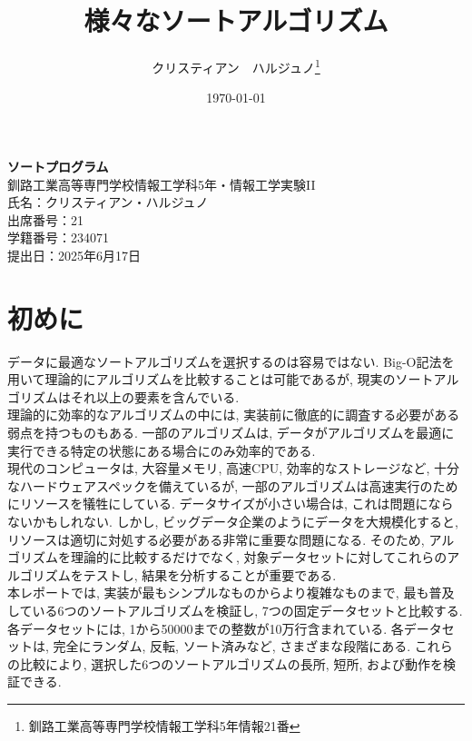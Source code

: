 \documentclass[a4j, 11pt]{jarticle}
\title{様々なソートアルゴリズム}
\author{クリスティアン　ハルジュノ\thanks{釧路工業高等専門学校情報工学科5年情報21番}}
\date{\today}
\begin{document}
\begin{titlepage}
  \centering
  \vspace*{3cm}

  {\fontsize{25pt}{36pt}\selectfont\bfseries ソートプログラム} \\[1cm]  %
  {\Large 釧路工業高等専門学校情報工学科5年・情報工学実験II} \\[1cm]
  {\large 氏名：クリスティアン・ハルジュノ} \\[1cm]
  {\large 出席番号：21} \\[1cm]
  {\large 学籍番号：234071} \\[5cm]


  {\Large 提出日：2025年6月17日} \\

  \vfill

\end{titlepage}
\tableofcontents
\newpage
\setcounter{page}{1}
\section{初めに}
データに最適なソートアルゴリズムを選択するのは容易ではない. Big-O記法を用いて理論的にアルゴリズムを比較することは可能であるが, 現実のソートアルゴリズムはそれ以上の要素を含んでいる\cite{energo2023bigoh}. \\

理論的に効率的なアルゴリズムの中には, 実装前に徹底的に調査する必要がある弱点を持つものもある. 一部のアルゴリズムは, データがアルゴリズムを最適に実行できる特定の状態にある場合にのみ効率的である. \\

現代のコンピュータは, 大容量メモリ, 高速CPU, 効率的なストレージなど, 十分なハードウェアスペックを備えているが, 一部のアルゴリズムは高速実行のためにリソースを犠牲にしている. データサイズが小さい場合は, これは問題にならないかもしれない. しかし, ビッグデータ企業のようにデータを大規模化すると, リソースは適切に対処する必要がある非常に重要な問題になる. そのため, アルゴリズムを理論的に比較するだけでなく, 対象データセットに対してこれらのアルゴリズムをテストし, 結果を分析することが重要である. \\

本レポートでは, 実装が最もシンプルなものからより複雑なものまで, 最も普及している6つのソートアルゴリズムを検証し, 7つの固定データセットと比較する. 各データセットには, 1から50000までの整数が10万行含まれている. 各データセットは, 完全にランダム, 反転, ソート済みなど, さまざまな段階にある. これらの比較により, 選択した6つのソートアルゴリズムの長所, 短所, および動作を検証できる. \\
\end{document}
